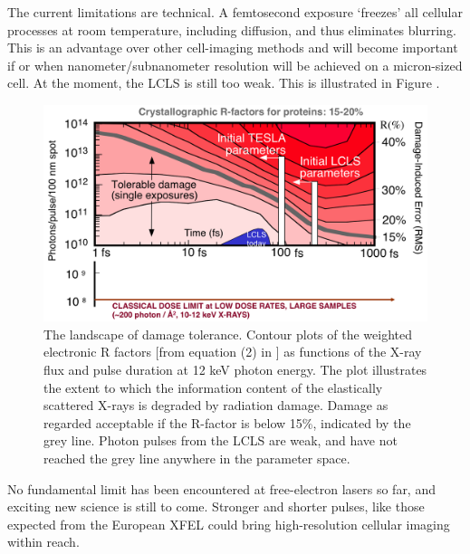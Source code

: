 The current limitations are technical. A femtosecond exposure ‘freezes’ all cellular processes at room temperature, including diffusion, and thus eliminates blurring. This is an advantage over other cell-imaging methods and will become important if or when nanometer/subnanometer resolution will be achieved on a micron-sized cell. At the moment, the LCLS is still too weak. This is illustrated in Figure .


\begin{figure}[!h]
\centering
\includegraphics[width=120mm]{Chapter_10_Discussion_LandscapeDamageTolerance.png}
\caption{The landscape of damage tolerance. Contour plots of the weighted electronic R factors [from equation (2) in \cite{Neutze2000}] as functions of the X-ray  flux and pulse duration at 12 keV photon energy. The plot illustrates the extent to which the information content of the elastically scattered X-rays is degraded by radiation damage. Damage as regarded acceptable if the R-factor is below 15\%,  indicated by the grey line. Photon pulses from the LCLS are weak, and have not reached the grey line anywhere in the parameter space.}\label{fig:landscape}
\end{figure}

No fundamental limit has been encountered at free-electron lasers so far, and exciting new science is still to come. Stronger and shorter pulses, like those expected from the European XFEL could bring high-resolution cellular imaging within reach. 
